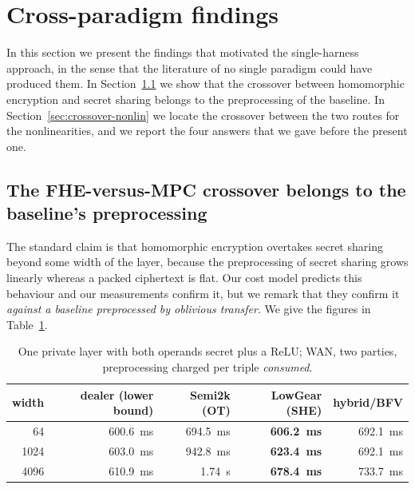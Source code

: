 \documentclass[11pt]{article}
\newcommand{\ReLU}{\ensuremath{\mathrm{ReLU}}}
\begin{document}
\section{Cross-paradigm findings}
\label{sec:cross}

In this section we present the findings that motivated the single-harness approach, in the
sense that the literature of no single paradigm could have produced them. In
Section~\ref{sec:crossover-fhe} we show that the crossover between homomorphic encryption and
secret sharing belongs to the preprocessing of the baseline. In
Section~\ref{sec:crossover-nonlin} we locate the crossover between the two routes for the
nonlinearities, and we report the four answers that we gave before the present one.

\subsection{The FHE-versus-MPC crossover belongs to the baseline's preprocessing}
\label{sec:crossover-fhe}

The standard claim is that homomorphic encryption overtakes secret sharing beyond some
width of the layer, because the preprocessing of secret sharing grows linearly whereas a packed
ciphertext is flat. Our cost model predicts this behaviour and our measurements confirm it, but
we remark that they confirm it \emph{against a baseline preprocessed by oblivious transfer}. We
give the figures in Table~\ref{tab:layer}.

\begin{table}[t]
\centering
\small
\begin{tabular}{@{}rrrrr@{}}
\toprule
width & dealer (lower bound) & Semi2k (OT) & \textbf{LowGear (SHE)} & hybrid/BFV \\
\midrule
64   & \SI{600.6}{\milli\second} & \SI{694.5}{\milli\second} & \textbf{\SI{606.2}{\milli\second}} & \SI{692.1}{\milli\second} \\
1024 & \SI{603.0}{\milli\second} & \SI{942.8}{\milli\second} & \textbf{\SI{623.4}{\milli\second}} & \SI{692.1}{\milli\second} \\
4096 & \SI{610.9}{\milli\second} & \SI{1.74}{\second}        & \textbf{\SI{678.4}{\milli\second}} & \SI{733.7}{\milli\second} \\
\bottomrule
\end{tabular}
\caption{One private layer with both operands secret plus a \ReLU{}; WAN, two
parties, preprocessing charged per triple \emph{consumed}.}
\label{tab:layer}
\end{table}
\end{document}
